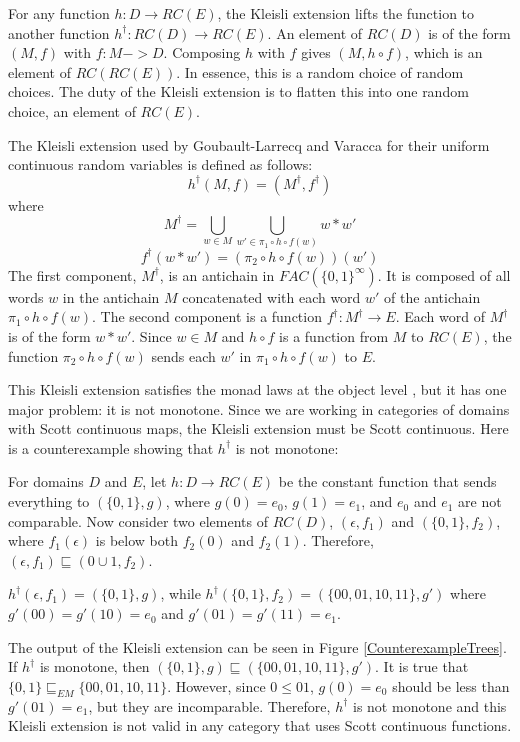 For any function $h:D\rightarrow RC(E)$, the Kleisli extension lifts the function to another function $h^\dagger:RC(D)\rightarrow RC(E)$.  An element of $RC(D)$ is of the form $(M,f)$ with $f:M->D$.  Composing $h$ with $f$ gives $(M,h\circ f)$, which is an element of $RC(RC(E))$.  In essence, this is a random choice of random choices.  The duty of the Kleisli extension is to flatten this into one random choice, an element of $RC(E)$.



The Kleisli extension used by Goubault-Larrecq and Varacca for their uniform continuous random variables is defined as follows:
\[h^\dagger (M,f) = (M^\dagger, f^\dagger)\]
where
\[M^\dagger = \bigcup_{w\in M} \bigcup_{w'\in \pi_1\circ h\circ f(w)} w * w'\]
\[f^\dagger (w*w') = (\pi_2\circ h\circ f(w))(w')\]
The first component, $M^\dagger$, is an antichain in $FAC(\{0,1\}^\infty)$.  It is composed of all words $w$ in the antichain $M$ concatenated with each word $w'$ of the antichain $\pi_1\circ h\circ f(w)$.  The second component is a function $f^\dagger:M^\dagger\rightarrow E$.  Each word of $M^\dagger$ is of the form $w*w'$. Since $w\in M$ and $h\circ f$ is a function from $M$ to $RC(E)$, the function $\pi_2\circ h \circ f(w)$ sends each $w'$ in $\pi_1\circ h\circ f(w)$ to $E$.   

This Kleisli extension satisfies the monad laws at the object level \cite{mislove2014anatomy}, but it has one major problem:  it is not monotone.  Since we are working in categories of domains with Scott continuous maps, the Kleisli extension must be Scott continuous.  Here is a counterexample showing that $h^\dagger$ is not monotone:

For domains $D$ and $E$, let $h:D\rightarrow RC(E)$ be the constant function that sends everything to $(\{0,1\}, g)$, where $g(0) = e_0$, $g(1) = e_1$, and $e_0$ and $e_1$ are not comparable.  Now consider two elements of $RC(D)$, $(\epsilon, f_1)$ and $(\{0,1\}, f_2)$, where $f_1(\epsilon)$ is below both $f_2(0)$ and $f_2(1)$.  Therefore, ${(\epsilon, f_1) \sqsubseteq (0\cup 1, f_2)}$. 

$h^\dagger (\epsilon, f_1) = (\{0,1\}, g)$, while $h^\dagger (\{0,1\}, f_2) = (\{00, 01, 10, 11\}, g')$ where 
$g'(00) = g'(10) = e_0$ and $g'(01) = g'(11) = e_1$.

The output of the Kleisli extension can be seen in Figure \ref{CounterexampleTrees}.
If $h^\dagger$ is monotone, then $(\{0,1\}, g) \sqsubseteq (\{00, 01,10,11\}, g')$.  It is true that $\{0,1\} \sqsubseteq_{EM} \{00,01,10,11\}$. However, since $0\leq 01$, $g(0) = e_0$ should be less than $g'(01) = e_1$, but they are incomparable.  Therefore, $h^\dagger$ is not monotone and this Kleisli extension is not valid in any category that uses Scott continuous functions.

